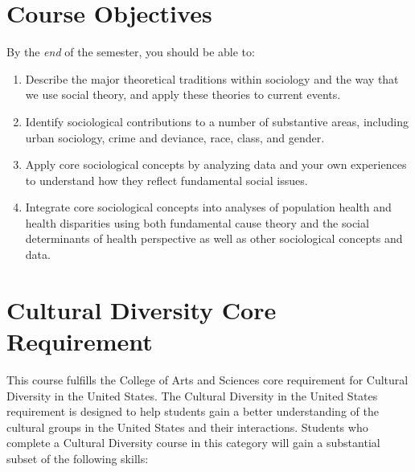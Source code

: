 \documentclass[
]{book}
\providecommand{\tightlist}{%
  \setlength{\itemsep}{0pt}\setlength{\parskip}{0pt}}
\begin{document}
\hypertarget{course-objectives}{%
\section{Course Objectives}\label{course-objectives}}

By the \emph{end} of the semester, you should be able to:

\begin{enumerate}
\def\labelenumi{\arabic{enumi}.}
\tightlist
\item
  Describe the major theoretical traditions within sociology and the way that we use social theory, and apply these theories to current events.
\item
  Identify sociological contributions to a number of substantive areas, including urban sociology, crime and deviance, race, class, and gender.
\item
  Apply core sociological concepts by analyzing data and your own experiences to understand how they reflect fundamental social issues.
\item
  Integrate core sociological concepts into analyses of population health and health disparities using both fundamental cause theory and the social determinants of health perspective as well as other sociological concepts and data.
\end{enumerate}

\hypertarget{cultural-diversity-core-requirement}{%
\section{Cultural Diversity Core Requirement}\label{cultural-diversity-core-requirement}}

This course fulfills the College of Arts and Sciences core requirement for Cultural Diversity in the United States. The Cultural Diversity in the United States requirement is designed to help students gain a better understanding of the cultural groups in the United States and their interactions. Students who complete a Cultural Diversity course in this category will gain a substantial subset of the following skills:
\end{document}

